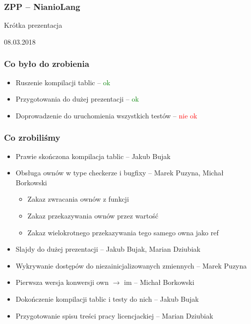 \documentclass{beamer}
\begin{document}
	\begin{frame}
		\frametitle{ZPP -- NianioLang}
		Krótka prezentacja
		
		08.03.2018
	\end{frame}
	
	\begin{frame}
		\frametitle{Co było do zrobienia}
		\begin{itemize}
			\item Ruszenie kompilacji tablic -- \textcolor{green}{ok}
			\item Przygotowania do dużej prezentacji -- \textcolor{green}{ok}
			\item Doprowadzenie do uruchomienia wszystkich testów -- \textcolor{red}{nie ok}
		\end{itemize}
	\end{frame}
	
	\begin{frame}
		\frametitle{Co zrobiliśmy}
		\begin{itemize}
			\item Prawie skończona kompilacja tablic -- Jakub Bujak
			\item Obsługa ownów w type checkerze i bugfixy -- Marek Puzyna, Michał Borkowski
			\begin{itemize}
				\item Zakaz zwracania ownów z funkcji
				\item Zakaz przekazywania ownów przez wartość
				\item Zakaz wielokrotnego przekazywania tego samego owna jako ref
			\end{itemize}
			\hrulefill
			\item Slajdy do dużej prezentacji -- Jakub Bujak, Marian Dziubiak
			\item Wykrywanie dostępów do niezainicjalizowanych zmiennych -- Marek Puzyna
			\item Pierwsza wersja konwersji own $\rightarrow$ im -- Michał Borkowski
			\item Dokończenie kompilacji tablic i testy do nich -- Jakub Bujak
			\item Przygotowanie spisu treści pracy licencjackiej -- Marian Dziubiak
		\end{itemize}
	\end{frame}
	
\end{document}
